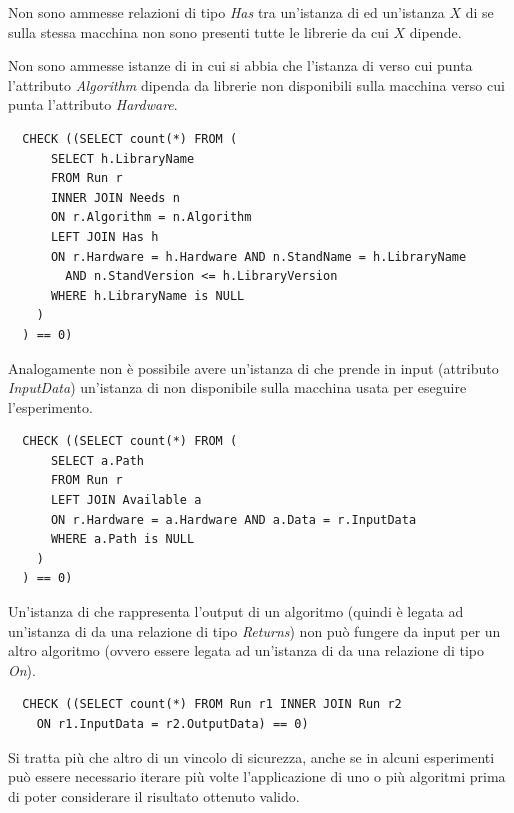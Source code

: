 \documentclass{article}
\begin{document}
Non sono ammesse relazioni di tipo \emph{Has} tra un'istanza di  ed un'istanza $X$ di  se sulla stessa macchina non sono presenti tutte le librerie da cui $X$ dipende.

Non sono ammesse istanze di  in cui si abbia che l'istanza di  verso cui punta l'attributo \emph{Algorithm} dipenda da librerie non disponibili sulla macchina verso cui punta l'attributo \emph{Hardware}.

\begin{verbatim}
  CHECK ((SELECT count(*) FROM (
      SELECT h.LibraryName
      FROM Run r
      INNER JOIN Needs n
      ON r.Algorithm = n.Algorithm
      LEFT JOIN Has h
      ON r.Hardware = h.Hardware AND n.StandName = h.LibraryName
        AND n.StandVersion <= h.LibraryVersion
      WHERE h.LibraryName is NULL
    )
  ) == 0)
\end{verbatim}

Analogamente non è possibile avere un'istanza di  che prende in input (attributo \emph{InputData}) un'istanza di  non disponibile sulla macchina usata per eseguire l'esperimento.

\begin{verbatim}
  CHECK ((SELECT count(*) FROM (
      SELECT a.Path
      FROM Run r
      LEFT JOIN Available a
      ON r.Hardware = a.Hardware AND a.Data = r.InputData
      WHERE a.Path is NULL
    )
  ) == 0)
\end{verbatim}

Un'istanza di  che rappresenta l'output di un algoritmo (quindi è legata ad un'istanza di  da una relazione di tipo \emph{Returns}) non può fungere da input per un altro algoritmo (ovvero essere legata ad un'istanza di  da una relazione di tipo \emph{On}).

\begin{verbatim}
  CHECK ((SELECT count(*) FROM Run r1 INNER JOIN Run r2
    ON r1.InputData = r2.OutputData) == 0)
\end{verbatim}

Si tratta più che altro di un vincolo di sicurezza, anche se in alcuni esperimenti può essere necessario iterare più volte l'applicazione di uno o più algoritmi prima di poter considerare il risultato ottenuto valido.
\end{document}
